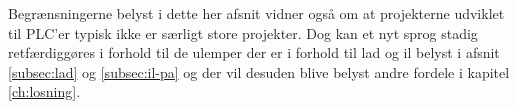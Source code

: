 \noindent Begrænsningerne belyst i dette her afsnit vidner også om at projekterne udviklet til PLC'er typisk ikke er særligt store projekter. Dog kan et nyt sprog stadig retfærdiggøres i forhold til de ulemper der er i forhold til \gls{lad} og \gls{il} belyst i afsnit \ref{subsec:lad} og \ref{subsec:il-pa} og der vil desuden blive belyst andre fordele i kapitel \ref{ch:losning}.















